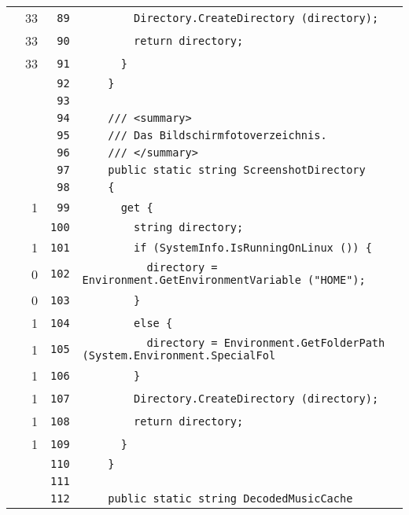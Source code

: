 \documentclass[a4paper,10pt]{article}
\begin{document}
\begin{longtable}[l]{lrrl}
\cellcolor{green} & 33 & \verb~89~ & \verb~        Directory.CreateDirectory (directory);~\\
\cellcolor{green} & 33 & \verb~90~ & \verb~        return directory;~\\
\cellcolor{green} & 33 & \verb~91~ & \verb~      }~\\
\cellcolor{gray} &  & \verb~92~ & \verb~    }~\\
\cellcolor{gray} &  & \verb~93~ & \verb~~\\
\cellcolor{gray} &  & \verb~94~ & \verb~    /// <summary>~\\
\cellcolor{gray} &  & \verb~95~ & \verb~    /// Das Bildschirmfotoverzeichnis.~\\
\cellcolor{gray} &  & \verb~96~ & \verb~    /// </summary>~\\
\cellcolor{gray} &  & \verb~97~ & \verb~    public static string ScreenshotDirectory~\\
\cellcolor{gray} &  & \verb~98~ & \verb~    {~\\
\cellcolor{green} & 1 & \verb~99~ & \verb~      get {~\\
\cellcolor{gray} &  & \verb~100~ & \verb~        string directory;~\\
\cellcolor{green} & 1 & \verb~101~ & \verb~        if (SystemInfo.IsRunningOnLinux ()) {~\\
\cellcolor{red} & 0 & \verb~102~ & \verb~          directory = Environment.GetEnvironmentVariable ("HOME");~\\
\cellcolor{red} & 0 & \verb~103~ & \verb~        }~\\
\cellcolor{green} & 1 & \verb~104~ & \verb~        else {~\\
\cellcolor{green} & 1 & \verb~105~ & \verb~          directory = Environment.GetFolderPath (System.Environment.SpecialFol~\\
\cellcolor{green} & 1 & \verb~106~ & \verb~        }~\\
\cellcolor{green} & 1 & \verb~107~ & \verb~        Directory.CreateDirectory (directory);~\\
\cellcolor{green} & 1 & \verb~108~ & \verb~        return directory;~\\
\cellcolor{green} & 1 & \verb~109~ & \verb~      }~\\
\cellcolor{gray} &  & \verb~110~ & \verb~    }~\\
\cellcolor{gray} &  & \verb~111~ & \verb~~\\
\cellcolor{gray} &  & \verb~112~ & \verb~    public static string DecodedMusicCache~\\

\end{longtable}
\end{document}
